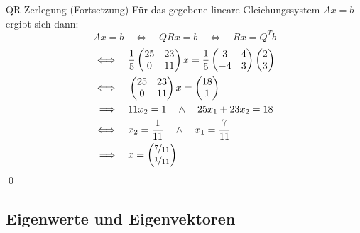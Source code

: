 \documentclass[german]{../spicker}
\newcommand{\vektor}[1]{\begin{pmatrix*}[c] #1 \end{pmatrix*}}
\begin{document}
\begin{example}{QR-Zerlegung (Fortsetzung)}
    Für das gegebene lineare Gleichungssystem $Ax = b$ ergibt sich dann:
    $$
        Ax = b \quad \iff \quad QRx = b  \quad \iff \quad Rx = Q^Tb
    $$
    $$
        \begin{aligned}
            \iff \quad     & \frac{1}{5} \vektor{25                                  & 23 \\ 0 & 11}x = \frac{1}{5}\vektor{3 & 4 \\ -4 & 3}\vektor{2\\3} \\
            \iff \quad     & \vektor{25                                              & 23 \\ 0 & 11}x = \vektor{18 \\ 1} \\
            \implies \quad & 11x_2 = 1 \quad \land \quad 25x_1 + 23x_2 = 18               \\
            \iff \quad     & x_2 = \frac{1}{11} \quad \land \quad x_1 = \frac{7}{11}      \\
            \implies \quad & x = \vektor{\nicefrac{7}{11}                                 \\ \nicefrac{1}{11}}
        \end{aligned}
    $$\qed
\end{example}

\subsection{Eigenwerte und Eigenvektoren}
\end{document}
